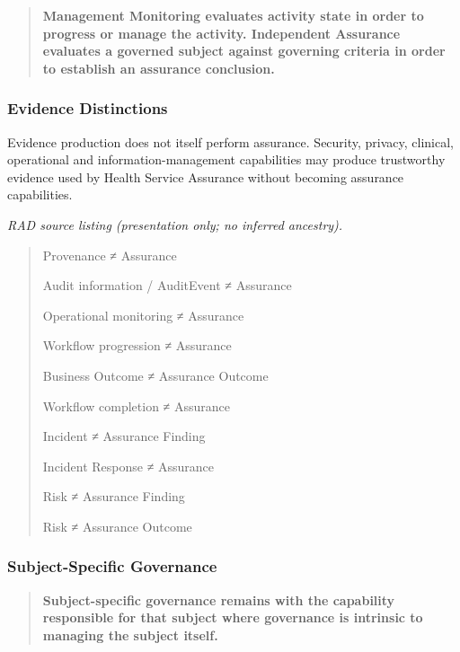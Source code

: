 \begin{quote}

\textbf{Management Monitoring evaluates activity state in order to progress or manage the activity. Independent Assurance evaluates a governed subject against governing criteria in order to establish an assurance conclusion.}


\end{quote}
\label{rad:business:1141}
\subsubsection*{Evidence Distinctions}
\label{rad:business:1143}

Evidence production does not itself perform assurance. Security, privacy, clinical, operational and information-management capabilities may produce trustworthy evidence used by Health Service Assurance without becoming assurance capabilities.

\label{rad:business:1145}

\textit{RAD source listing (presentation only; no inferred ancestry).}
\begin{quote}
Provenance ≠ Assurance

Audit information / AuditEvent ≠ Assurance

Operational monitoring ≠ Assurance

Workflow progression ≠ Assurance

Business Outcome ≠ Assurance Outcome

Workflow completion ≠ Assurance

Incident ≠ Assurance Finding

Incident Response ≠ Assurance

Risk ≠ Assurance Finding

Risk ≠ Assurance Outcome
\end{quote}
\label{rad:business:1158}
\subsubsection*{Subject-Specific Governance}
\label{rad:business:1160}

\begin{quote}

\textbf{Subject-specific governance remains with the capability responsible for that subject where governance is intrinsic to managing the subject itself.}


\end{quote}
\label{rad:business:1162}

